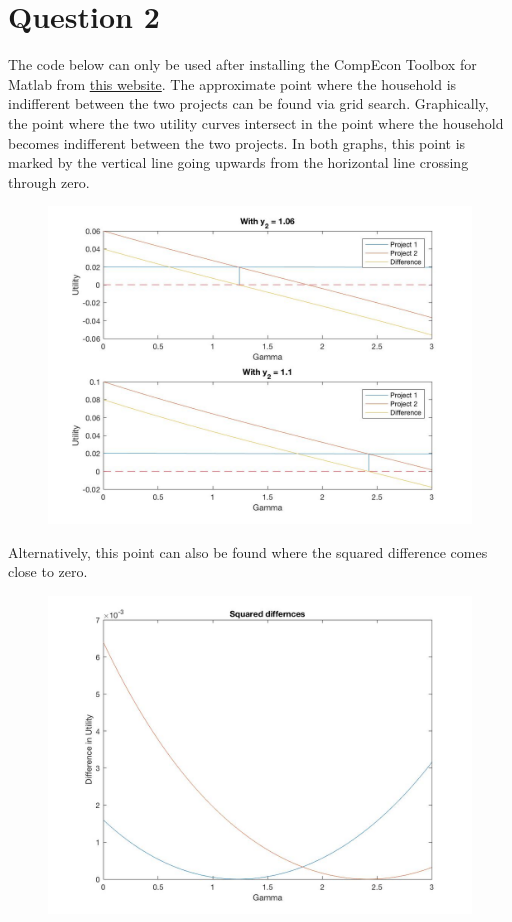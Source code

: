 \documentclass{article}
\begin{document}
	\section{Question 2}
	The code below can only be used after installing the CompEcon Toolbox for Matlab from \href{http://www4.ncsu.edu/~pfackler/compecon/toolbox.html}{this website}.
	The approximate point where the household is indifferent between the two projects can be found via grid search. Graphically, the point where the two utility curves intersect in the point where the household becomes indifferent between the two projects. In both graphs, this point is marked by the vertical line going upwards from the horizontal line crossing through zero.
	\begin{figure}[h]
		\includegraphics[width = \textwidth, keepaspectratio]{PS5Q2Sub3_Utility.jpg} 
	\end{figure}
	Alternatively, this point can also be found where the squared difference comes close to zero. \begin{figure}[h]
		\includegraphics[width = \textwidth, keepaspectratio]{PS5Q2Sub3_Squared_Diff.jpg}
	\end{figure}
\end{document}
